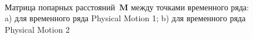 \begin{figure}[h!t]\center
{}
\\
\caption{Матрица попарных расстояний~$\textbf{M}$ между точками временного ряда: a) для временного ряда Physical Motion 1; b) для временного ряда Physical Motion 2}
\label{fig_real_distance}
\end{figure}

